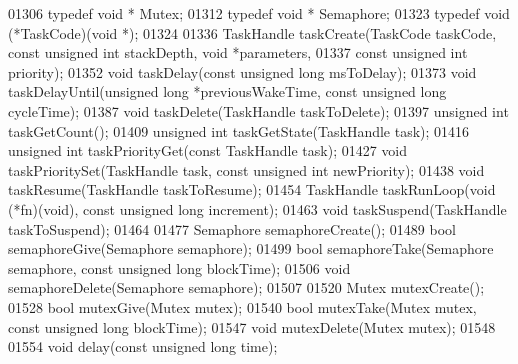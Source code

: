 \begin{DoxyCode}
01306 \textcolor{keyword}{typedef} \textcolor{keywordtype}{void} * Mutex;
01312 \textcolor{keyword}{typedef} \textcolor{keywordtype}{void} * Semaphore;
01323 \textcolor{keyword}{typedef} void (*TaskCode)(\textcolor{keywordtype}{void} *);
01324 
01336 TaskHandle taskCreate(TaskCode taskCode, \textcolor{keyword}{const} \textcolor{keywordtype}{unsigned} \textcolor{keywordtype}{int} stackDepth, \textcolor{keywordtype}{void} *parameters,
01337     \textcolor{keyword}{const} \textcolor{keywordtype}{unsigned} \textcolor{keywordtype}{int} priority);
01352 \textcolor{keywordtype}{void} taskDelay(\textcolor{keyword}{const} \textcolor{keywordtype}{unsigned} \textcolor{keywordtype}{long} msToDelay);
01373 \textcolor{keywordtype}{void} taskDelayUntil(\textcolor{keywordtype}{unsigned} \textcolor{keywordtype}{long} *previousWakeTime, \textcolor{keyword}{const} \textcolor{keywordtype}{unsigned} \textcolor{keywordtype}{long} cycleTime);
01387 \textcolor{keywordtype}{void} taskDelete(TaskHandle taskToDelete);
01397 \textcolor{keywordtype}{unsigned} \textcolor{keywordtype}{int} taskGetCount();
01409 \textcolor{keywordtype}{unsigned} \textcolor{keywordtype}{int} taskGetState(TaskHandle task);
01416 \textcolor{keywordtype}{unsigned} \textcolor{keywordtype}{int} taskPriorityGet(\textcolor{keyword}{const} TaskHandle task);
01427 \textcolor{keywordtype}{void} taskPrioritySet(TaskHandle task, \textcolor{keyword}{const} \textcolor{keywordtype}{unsigned} \textcolor{keywordtype}{int} newPriority);
01438 \textcolor{keywordtype}{void} taskResume(TaskHandle taskToResume);
01454 TaskHandle taskRunLoop(\textcolor{keywordtype}{void} (*fn)(\textcolor{keywordtype}{void}), \textcolor{keyword}{const} \textcolor{keywordtype}{unsigned} \textcolor{keywordtype}{long} increment);
01463 \textcolor{keywordtype}{void} taskSuspend(TaskHandle taskToSuspend);
01464 
01477 Semaphore semaphoreCreate();
01489 \textcolor{keywordtype}{bool} semaphoreGive(Semaphore semaphore);
01499 \textcolor{keywordtype}{bool} semaphoreTake(Semaphore semaphore, \textcolor{keyword}{const} \textcolor{keywordtype}{unsigned} \textcolor{keywordtype}{long} blockTime);
01506 \textcolor{keywordtype}{void} semaphoreDelete(Semaphore semaphore);
01507 
01520 Mutex mutexCreate();
01528 \textcolor{keywordtype}{bool} mutexGive(Mutex mutex);
01540 \textcolor{keywordtype}{bool} mutexTake(Mutex mutex, \textcolor{keyword}{const} \textcolor{keywordtype}{unsigned} \textcolor{keywordtype}{long} blockTime);
01547 \textcolor{keywordtype}{void} mutexDelete(Mutex mutex);
01548 
01554 \textcolor{keywordtype}{void} delay(\textcolor{keyword}{const} \textcolor{keywordtype}{unsigned} \textcolor{keywordtype}{long} time);

\end{DoxyCode}
